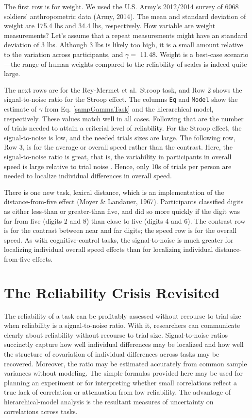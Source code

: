 \documentclass[
  ,man]{apa6}
\begin{document}
The first row is for weight. We used the U.S. Army's 2012/2014 survey of 6068 soldiers' anthropometric data (Army, 2014). The mean and standard deviation of weight are 175.4 lbs and 34.4 lbs, respectively. How variable are weight measurements? Let's assume that a repeat measurements might have an standard deviation of 3 lbs. Although 3 lbs is likely too high, it is a small amount relative to the variation across participants, and \(\gamma =\) 11.48. Weight is a best-case scenario---the range of human weights compared to the reliability of scales is indeed quite large.

The next rows are for the Rey-Mermet et al.~Stroop task, and Row 2 shows the signal-to-noise ratio for the Stroop effect. The columns \texttt{Eq} and \texttt{Model} show the estimate of \(\gamma\) from Eq. \ref{sampGammaTask} and the hierarchical model, respectively. These values match well in all cases. Following that are the number of trials needed to attain a criterial level of reliability. For the Stroop effect, the signal-to-noise is low, and the needed trials sizes are large. The following row, Row 3, is for the average or overall speed rather than the contrast. Here, the signal-to-noise ratio is great, that is, the variability in participants in overall speed is large relative to trial noise . Hence, only 10s of trials per person are needed to localize individual differences in overall speed.

There is one new task, lexical distance, which is an implementation of the distance-from-five effect (Moyer \& Landauer, 1967). Participants classified digits as either less-than or greater-than five, and did so more quickly if the digit was far from five (digits 2 and 8) than close to five (digits 4 and 6). The contrast row is for the contrast between near and far digits; the speed row is for the overall speed. As with cognitive-control tasks, the signal-to-noise is much greater for localizing individual overall speed effects than for localizing individual distance-from-five effects.

\hypertarget{the-reliability-crisis-revisited}{%
\section{The Reliability Crisis Revisited}\label{the-reliability-crisis-revisited}}

The reliability of a task can be profitably assessed without recourse to trial size when reliability is a signal-to-noise ratio. With it, researchers can communicate clearly about reliability without recourse to trial size. Signal-to-noise ratios succinctly capture how well individual differences may be localized and how well the structure of covariation of individual differences across tasks may be recovered. Moreover, the ratio may be estimated accurately from common sample variances without modeling. The simple formulas provided here may be used for planning an experiment or for interpreting whether small correlations reflect a true lack of correlation or attenuation from low reliability. The advantage of hierarchical-model analysis is the resultant measures of uncertainty on correlations across tasks.
\end{document}
